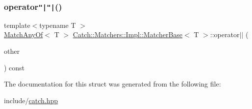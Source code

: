 \mbox{\label{struct_catch_1_1_matchers_1_1_impl_1_1_matcher_base_a5f8542b8f1567a6f9c65d0a6da7b679b}} 
\subsubsection{\texorpdfstring{operator\texttt{"|}\texttt{"|}()}{operator||()}}
{\footnotesize\ttfamily template$<$typename T $>$ \\
\mbox{\hyperlink{struct_catch_1_1_matchers_1_1_impl_1_1_match_any_of}{Match\+Any\+Of}}$<$ T $>$ \mbox{\hyperlink{struct_catch_1_1_matchers_1_1_impl_1_1_matcher_base}{Catch\+::\+Matchers\+::\+Impl\+::\+Matcher\+Base}}$<$ T $>$\+::operator$\vert$$\vert$ (\begin{DoxyParamCaption}\item[{\mbox{\hyperlink{struct_catch_1_1_matchers_1_1_impl_1_1_matcher_base}{Matcher\+Base}}$<$ T $>$ const \&}]{other }\end{DoxyParamCaption}) const}



The documentation for this struct was generated from the following file\+:\begin{DoxyCompactItemize}
\item 
include/\mbox{\hyperlink{catch_8hpp}{catch.\+hpp}}\end{DoxyCompactItemize}
